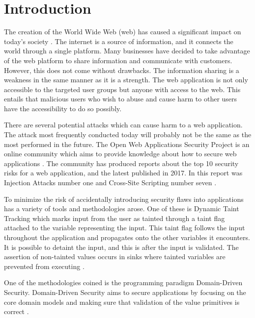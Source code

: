 \chapter{Introduction}
\label{Introduction}
The creation of the World Wide Web (web) has caused a significant impact on today's society \parencite{www}. The internet is a source of information, and it connects the world through a single platform. Many businesses have decided to take advantage of the web platform to share information and communicate with customers. However, this does not come without drawbacks. The information sharing is a weakness in the same manner as it is a strength. The web application is not only accessible to the targeted user groups but anyone with access to the web. This entails that malicious users who wish to abuse and cause harm to other users have the accessibility to do so possibly.

There are several potential attacks which can cause harm to a web application. The attack most frequently conducted today will probably not be the same as the most performed in the future. The Open Web Applications Security Project is an online community which aims to provide knowledge about how to secure web applications \parencite{OpenWebApplicationSecurityProject}. The community has produced reports about the top 10 security risks for a web application, and the latest published in 2017. In this report was Injection Attacks number one and Cross-Site Scripting number seven \parencite{OWASP2017, OpenWebApplicationSecurityProject, CrossMichael2007Dgtw}.

To minimize the risk of accidentally introducing security flaws into applications has a variety of tools and methodologies arose. One of these is Dynamic Taint Tracking which marks input from the user as tainted through a taint flag attached to the variable representing the input. This taint flag follows the input throughout the application and propagates onto the other variables it encounters. It is possible to detaint the input, and this is after the input is validated. The assertion of non-tainted values occurs in sinks where tainted variables are prevented from executing \parencite{Pan2015, Venkataramani2008}. 

One of the methodologies coined is the programming paradigm Domain-Driven Security. Domain-Driven Security aims to secure applications by focusing on the core domain models and making sure that validation of the value primitives is correct \parencite{Wilander2009, Johnsson2009}.

